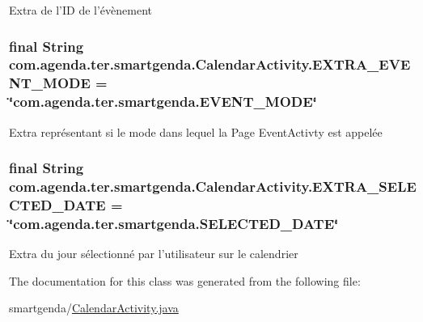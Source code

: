 Extra de l'I\-D de l'évènement \hypertarget{classcom_1_1agenda_1_1ter_1_1smartgenda_1_1_calendar_activity_a81bbde4b954d1e113b2152a6246e3770}{
\subsubsection[{E\-X\-T\-R\-A\-\_\-\-E\-V\-E\-N\-T\-\_\-\-M\-O\-D\-E}]{\setlength{\rightskip}{0pt plus 5cm}final String com.\-agenda.\-ter.\-smartgenda.\-Calendar\-Activity.\-E\-X\-T\-R\-A\-\_\-\-E\-V\-E\-N\-T\-\_\-\-M\-O\-D\-E = \char`\"{}com.\-agenda.\-ter.\-smartgenda.\-E\-V\-E\-N\-T\-\_\-\-M\-O\-D\-E\char`\"{}\hspace{0.3cm}{\ttfamily [static]}}}\label{classcom_1_1agenda_1_1ter_1_1smartgenda_1_1_calendar_activity_a81bbde4b954d1e113b2152a6246e3770}
Extra représentant si le mode dans lequel la Page Event\-Activty est appelée \hypertarget{classcom_1_1agenda_1_1ter_1_1smartgenda_1_1_calendar_activity_a29abe4db6b74d419544044cf40ef6b01}{
\subsubsection[{E\-X\-T\-R\-A\-\_\-\-S\-E\-L\-E\-C\-T\-E\-D\-\_\-\-D\-A\-T\-E}]{\setlength{\rightskip}{0pt plus 5cm}final String com.\-agenda.\-ter.\-smartgenda.\-Calendar\-Activity.\-E\-X\-T\-R\-A\-\_\-\-S\-E\-L\-E\-C\-T\-E\-D\-\_\-\-D\-A\-T\-E = \char`\"{}com.\-agenda.\-ter.\-smartgenda.\-S\-E\-L\-E\-C\-T\-E\-D\-\_\-\-D\-A\-T\-E\char`\"{}\hspace{0.3cm}{\ttfamily [static]}}}\label{classcom_1_1agenda_1_1ter_1_1smartgenda_1_1_calendar_activity_a29abe4db6b74d419544044cf40ef6b01}
Extra du jour sélectionné par l'utilisateur sur le calendrier 

The documentation for this class was generated from the following file\-:\begin{DoxyCompactItemize}
\item 
smartgenda/\hyperlink{_calendar_activity_8java}{Calendar\-Activity.\-java}\end{DoxyCompactItemize}
